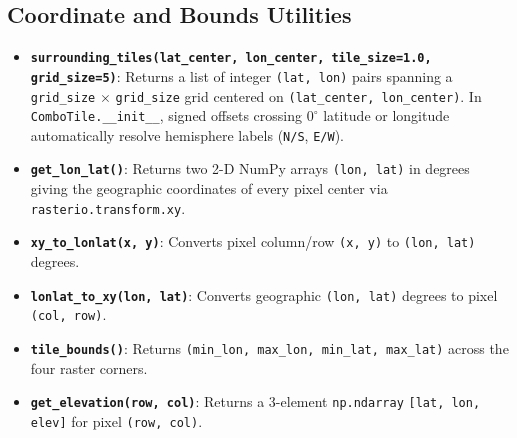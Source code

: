 \documentclass[11pt,letterpaper]{article}
\begin{document}
\subsection{Coordinate and Bounds Utilities}
\begin{itemize}
  \item \textbf{\texttt{surrounding\_tiles(lat\_center, lon\_center, tile\_size=1.0, grid\_size=5)}}: Returns a list of integer \texttt{(lat, lon)} pairs spanning a \texttt{grid\_size} $\times$ \texttt{grid\_size} grid centered on \texttt{(lat\_center, lon\_center)}. In \texttt{ComboTile.\_\_init\_\_}, signed offsets crossing $0^\circ$ latitude or longitude automatically resolve hemisphere labels (\texttt{N/S}, \texttt{E/W}).
  \item \textbf{\texttt{get\_lon\_lat()}}: Returns two 2-D NumPy arrays \texttt{(lon, lat)} in degrees giving the geographic coordinates of every pixel center via \texttt{rasterio.transform.xy}.
  \item \textbf{\texttt{xy\_to\_lonlat(x, y)}}: Converts pixel column/row \texttt{(x, y)} to \texttt{(lon, lat)} degrees.
  \item \textbf{\texttt{lonlat\_to\_xy(lon, lat)}}: Converts geographic \texttt{(lon, lat)} degrees to pixel \texttt{(col, row)}.
  \item \textbf{\texttt{tile\_bounds()}}: Returns \texttt{(min\_lon, max\_lon, min\_lat, max\_lat)} across the four raster corners.
  \item \textbf{\texttt{get\_elevation(row, col)}}: Returns a 3-element \texttt{np.ndarray} \texttt{[lat, lon, elev]} for pixel \texttt{(row, col)}.
\end{itemize}
\end{document}
